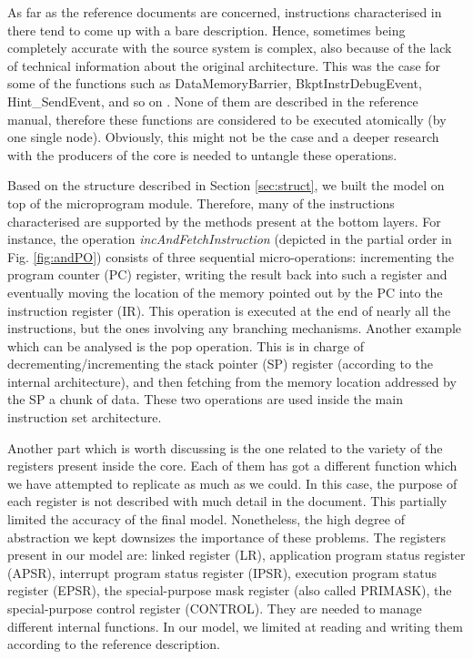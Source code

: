 \documentclass[conference]{IEEEtran}
\begin{document}
As far as the reference documents are concerned, instructions characterised in there tend to
come up with a bare description. Hence, sometimes being completely accurate with 
the source system is complex, also because of the lack of technical information about the
original architecture. This was the case for some of the functions such as DataMemoryBarrier,
BkptInstrDebugEvent, Hint\_SendEvent, and so on \cite{armManual}.
None of them are described in the reference manual, therefore these
functions are considered to be executed atomically (by one single node). Obviously, this
might not be the case and a deeper research with the producers of the core is needed to
untangle these operations.

Based on the structure described in Section \ref{sec:struct}, we built the model on top of
the microprogram module. Therefore, many of the instructions characterised are supported by
the methods present at the bottom layers. For instance, the operation
\textit{incAndFetchInstruction} (depicted in the partial order in Fig. \ref{fig:andPO})
consists of three sequential micro-operations: incrementing the program counter (PC)
register, writing the result back into such a register and eventually moving the location of
the memory pointed out by the PC into the instruction register (IR). This operation is
executed at the end of nearly all the instructions, but the ones involving any branching
mechanisms. Another example which can be analysed is the pop operation. This is in charge of
decrementing/incrementing the stack pointer (SP) register (according to the internal
architecture), and then fetching from the memory location addressed by the SP a chunk of 
data. These two operations are used inside the main instruction set architecture.

Another part which is worth discussing is the one related to the variety of the
registers present inside the core. Each of them has got a different function which we have
attempted to replicate as much as we could. In this case, the purpose of each register
is not described with much detail in the document. This partially limited the accuracy of the
final model. Nonetheless, the high degree of abstraction we kept downsizes the importance of
these problems. The registers present in our model are: linked register (LR), application
program status register (APSR), interrupt program status register (IPSR), execution program
status register (EPSR), the special-purpose mask register (also called PRIMASK), the special-purpose control register (CONTROL). They are needed to manage different internal functions.
In our model, we limited at reading and writing them according to the reference description.
\end{document}

